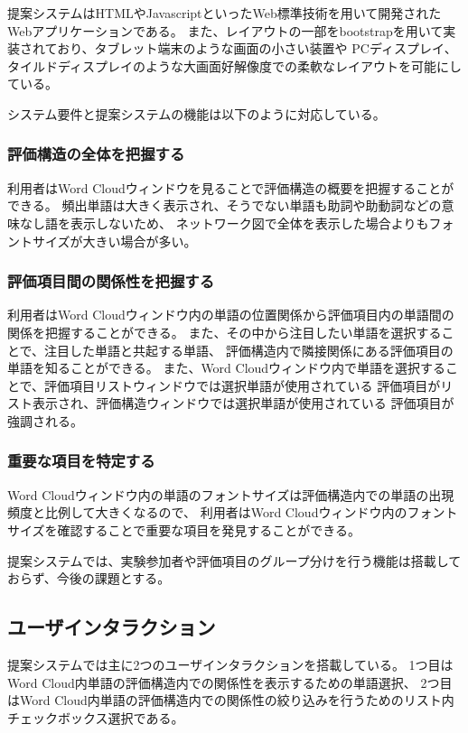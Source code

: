 \documentclass[syuuron]{kuee}
\begin{document}
			提案システムはHTMLやJavascriptといったWeb標準技術を用いて開発されたWebアプリケーションである。
			また、レイアウトの一部をbootstrapを用いて実装されており、タブレット端末のような画面の小さい装置や
			PCディスプレイ、タイルドディスプレイのような大画面好解像度での柔軟なレイアウトを可能にしている。
			
			システム要件と提案システムの機能は以下のように対応している。
			\subsubsection{評価構造の全体を把握する}
				利用者はWord Cloudウィンドウを見ることで評価構造の概要を把握することができる。
				頻出単語は大きく表示され、そうでない単語も助詞や助動詞などの意味なし語を表示しないため、
				ネットワーク図で全体を表示した場合よりもフォントサイズが大きい場合が多い。				
			\subsubsection{評価項目間の関係性を把握する}
				利用者はWord Cloudウィンドウ内の単語の位置関係から評価項目内の単語間の関係を把握することができる。
				また、その中から注目したい単語を選択することで、注目した単語と共起する単語、
				評価構造内で隣接関係にある評価項目の単語を知ることができる。
				また、Word Cloudウィンドウ内で単語を選択することで、評価項目リストウィンドウでは選択単語が使用されている
				評価項目がリスト表示され、評価構造ウィンドウでは選択単語が使用されている
				評価項目が強調される。
			\subsubsection{重要な項目を特定する}
				Word Cloudウィンドウ内の単語のフォントサイズは評価構造内での単語の出現頻度と比例して大きくなるので、
				利用者はWord Cloudウィンドウ内のフォントサイズを確認することで重要な項目を発見することができる。
			
			提案システムでは、実験参加者や評価項目のグループ分けを行う機能は搭載しておらず、今後の課題とする。			
			
		\subsection{ユーザインタラクション}
			提案システムでは主に2つのユーザインタラクションを搭載している。
			1つ目はWord Cloud内単語の評価構造内での関係性を表示するための単語選択、
			2つ目はWord Cloud内単語の評価構造内での関係性の絞り込みを行うためのリスト内チェックボックス選択である。
			
\end{document}
